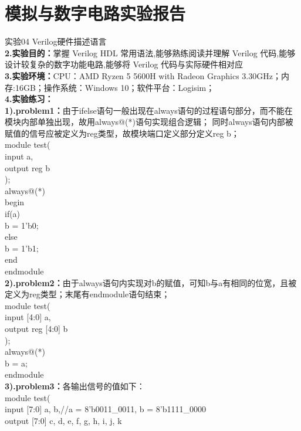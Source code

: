 \documentclass[12pt]{ctexart}
\begin{document}
\section*{模拟与数字电路实验报告}
实验04 Verilog硬件描述语言\\
{\bf2.实验目的：}掌握 Verilog HDL 常用语法,能够熟练阅读并理解 Verilog 代码,能够设计较复杂的数字功能电路,能够将 Verilog 代码与实际硬件相对应\\
{\bf3.实验环境：}CPU：AMD Ryzen 5 5600H with Radeon Graphics 3.30GHz；内存:16GB；操作系统：Windows 10；软件平台：Logisim；\\
{\bf4.实验练习：}\\
{\bf1).problem1：}由于ifelse语句一般出现在always语句的过程语句部分，而不能在模块内部单独出现，故用always@(*)语句实现组合逻辑；
同时always语句内部被赋值的信号应被定义为reg类型，故模块端口定义部分定义reg b；\\
module test(\\
input a,\\
output reg b\\
);\\
always@(*)\\
begin\\
\hspace*{0.5cm}if(a)\\
\hspace*{1cm}b = 1'b0;\\
\hspace*{0.5cm}else\\
\hspace*{1cm}b = 1'b1;\\
end\\
endmodule\\
{\bf2).problem2：}由于always语句内实现对b的赋值，可知b与a有相同的位宽，且被定义为reg类型；末尾有endmodule语句结束；\\
module test(\\
input [4:0] a,\\
output reg [4:0] b\\
);\\
always@(*)\\
\hspace*{0.5cm}b = a;\\
endmodule\\
{\bf3).problem3：}各输出信号的值如下：\\
module test(\\
input [7:0] a, b,//a = 8'b0011\_0011,  b = 8'b1111\_0000\\
output [7:0] c, d, e, f, g, h, i, j, k\\
\end{document}
